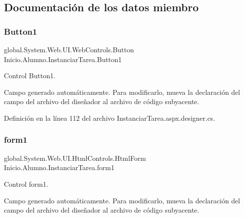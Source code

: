 \begin{DoxyCode}{0}

\end{DoxyCode}


\subsection{Documentación de los datos miembro}
\mbox{\label{classInicio_1_1Alumno_1_1InstanciarTarea_a6753e6c05b605f57086ab872578943f6}} 
\subsubsection{\texorpdfstring{Button1}{Button1}}
{\footnotesize\ttfamily global.\+System.\+Web.\+U\+I.\+Web\+Controls.\+Button Inicio.\+Alumno.\+Instanciar\+Tarea.\+Button1\hspace{0.3cm}{\ttfamily [protected]}}



Control Button1. 

Campo generado automáticamente. Para modificarlo, mueva la declaración del campo del archivo del diseñador al archivo de código subyacente. 

Definición en la línea 112 del archivo Instanciar\+Tarea.\+aspx.\+designer.\+cs.

\mbox{\label{classInicio_1_1Alumno_1_1InstanciarTarea_a294c0a36ba084c79f067abd0d7cf5852}} 
\subsubsection{\texorpdfstring{form1}{form1}}
{\footnotesize\ttfamily global.\+System.\+Web.\+U\+I.\+Html\+Controls.\+Html\+Form Inicio.\+Alumno.\+Instanciar\+Tarea.\+form1\hspace{0.3cm}{\ttfamily [protected]}}



Control form1. 

Campo generado automáticamente. Para modificarlo, mueva la declaración del campo del archivo del diseñador al archivo de código subyacente. 

